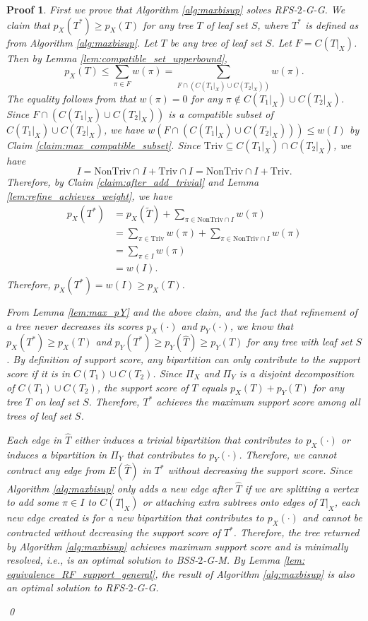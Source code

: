 \documentclass[twocolumn]{bmcart}%
\newcommand{\triv}{\mathrm{Triv}}
\newcommand{\ntriv}{\mathrm{NonTriv}}
\newcommand{\bsstwo}{\textsc{BSS-$2$}\xspace}
\newcommand{\rftwo}{\textsc{RFS-$2$}\xspace}
\renewcommand{\G}{\textsc{G}\xspace}
\renewcommand{\M}{\textsc{M}\xspace}
\theoremstyle{mystyle}
\theoremstyle{proofstyle}
\newtheorem*{proof2}{Proof}
\newenvironment{proofnospace}{\begin{proof2}}{\qed \end{proof2}}
\begin{document}
\begin{proofnospace}
First we prove that Algorithm \ref{alg:maxbisup} solves \rftwo-\G-\G. We claim that $p_X(T^*) \ge p_X(T)$ for any tree $T$ of leaf set $S$, where $T^*$ is defined as from Algorithm \ref{alg:maxbisup}. Let $T$ be any tree of leaf set $S$. Let $F = C(T|_X)$. Then by Lemma \ref{lem:compatible_set_upperbound}, \[p_X(T) \le \sum_{\pi \in F} w(\pi) = \sum_{F \cap (C(T_1|_X) \cup C(T_2|_X))} w(\pi).\] The equality follows from that $w(\pi) = 0$ for any $\pi \notin C(T_1|_X) \cup C(T_2|_X)$. Since $F \cap (C(T_1|_X) \cup C(T_2|_X))$ is a compatible subset of $C(T_1|_X) \cup C(T_2|_X)$, we have $w(F \cap (C(T_1|_X) \cup C(T_2|_X))) \le w(I)$ by Claim \ref{claim:max_compatible_subset}. Since $\triv \subseteq C(T_1|_X) \cap C(T_2|_X)$, we have
\[I = \ntriv \cap I + \triv\cap I = \ntriv\cap I + \triv.\]
Therefore, by Claim \ref{claim:after_add_trivial} and Lemma \ref{lem:refine_achieves_weight},  we have
\begin{align*}
    p_X(T^*)&= p_X(\tilde{T}) + \sum_{\pi \in \ntriv \cap I} w(\pi) \\
    & = \sum_{\pi \in \triv} w(\pi) + \sum_{\pi \in \ntriv \cap I} w(\pi)\\
    & = \sum_{\pi \in I} w(\pi)\\
    &= w(I).
\end{align*} 
Therefore, $p_X(T^*) = w(I) \ge p_X(T)$. 

From Lemma \ref{lem:max_pY} and the above claim, and the fact that refinement of a tree never decreases its scores $p_X(\cdot)$ and $p_Y(\cdot)$, we know that $p_X(T^*) \ge p_X(T)$ and $p_Y(T^*) \ge p_Y(\hat{T}) \ge p_Y(T)$ for any tree with leaf set $S$. By definition of support score, any bipartition can only contribute to the support score if it is in $C(T_1) \cup C(T_2)$. Since $\Pi_X$ and $\Pi_Y$ is a disjoint decomposition of $C(T_1) \cup C(T_2)$, the support score of $T$ equals $p_X(T) + p_Y(T)$ for any tree $T$ on leaf set $S$. Therefore, $T^*$ achieves the maximum support score among all trees of leaf set $S$. 

Each edge in $\hat{T}$ either induces a trivial bipartition that contributes to $p_X(\cdot)$ or induces a bipartition in $\Pi_Y$ that contributes to $p_Y(\cdot)$. Therefore, we cannot contract any edge from $E(\hat{T})$ in $T^*$ without decreasing the support score. Since Algorithm \ref{alg:maxbisup} only adds a new edge after $\hat{T}$ if we are splitting a vertex to add some $\pi \in I$ to $C(T|_X)$ or attaching extra subtrees onto edges of $T|_X$, each new edge created is for a new bipartition that contributes to $p_X(\cdot)$ and cannot be contracted without decreasing the support score of $T^*$. Therefore, the tree returned by Algorithm \ref{alg:maxbisup} achieves maximum support score and is minimally resolved, i.e., is an optimal solution to \bsstwo-\G-\M. By Lemma \ref{lem: equivalence_RF_support_general}, the result of Algorithm \ref{alg:maxbisup} is also an optimal solution to \rftwo-\G-\G. 


\end{proofnospace}
\end{document}
